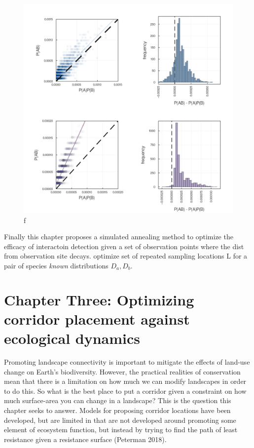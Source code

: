\documentclass[10pt,oneside]{article}
\makeatletter
\def\maxwidth{\ifdim\Gin@nat@width>\linewidth\linewidth
\else\Gin@nat@width\fi}
\let\Oldincludegraphics\includegraphics
\renewcommand{\includegraphics}[1]{\Oldincludegraphics[width=\maxwidth]{#1}}
\makeatother
\begin{document}
\begin{figure}
\hypertarget{fig:posassoc}{%
\centering
\includegraphics{./figures/positiveassociations.png}
\caption{f}\label{fig:posassoc}
}
\end{figure}

Finally this chapter proposes a simulated annealing method to optimize
the efficacy of interactoin detection given a set of observation points
where the dist from observation site decays. optimize set of repeated
sampling locations L for a pair of species \emph{known} distributions
\(D_a, D_b\).

\hypertarget{chapter-three-optimizing-corridor-placement-against-ecological-dynamics}{%
\section{Chapter Three: Optimizing corridor placement against ecological
dynamics}\label{chapter-three-optimizing-corridor-placement-against-ecological-dynamics}}

Promoting landscape connectivity is important to mitigate the effects of
land-use change on Earth's biodiversity. However, the practical
realities of conservation mean that there is a limitation on how much we
can modify landscapes in order to do this. So what is the best place to
put a corridor given a constraint on how much surface-area you can
change in a landscape? This is the question this chapter seeks to
answer. Models for proposing corridor locations have been developed, but
are limited in that are not developed around promoting some element of
ecosystem function, but instead by trying to find the path of least
resistance given a resistance surface (Peterman 2018).
\end{document}
